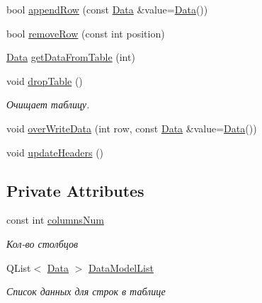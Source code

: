 \begin{DoxyCompactItemize}
\item 
bool \mbox{\hyperlink{class_my_table_model_a2d1347632c07b69acbd208cc087d6397}{append\+Row}} (const \mbox{\hyperlink{class_data}{Data}} \&value=\mbox{\hyperlink{class_data}{Data}}())
\item 
bool \mbox{\hyperlink{class_my_table_model_ae8c18be5372bf17454d21b12a368ebb3}{remove\+Row}} (const int position)
\item 
\mbox{\hyperlink{class_data}{Data}} \mbox{\hyperlink{class_my_table_model_abf64dd06923af11bcd4bdc6d759402ce}{get\+Data\+From\+Table}} (int)
\item 
\mbox{\label{class_my_table_model_a4f5e129d5da917fe2155a5e0982caf4b}} 
void \mbox{\hyperlink{class_my_table_model_a4f5e129d5da917fe2155a5e0982caf4b}{drop\+Table}} ()
\begin{DoxyCompactList}\small\item\em Очищает таблицу. \end{DoxyCompactList}\item 
void \mbox{\hyperlink{class_my_table_model_a878078058b205a92c195d43aa45376db}{over\+Write\+Data}} (int row, const \mbox{\hyperlink{class_data}{Data}} \&value=\mbox{\hyperlink{class_data}{Data}}())
\item 
void \mbox{\hyperlink{class_my_table_model_adfcdee0f5dc44c611cc8e1cfd4fec6dd}{update\+Headers}} ()
\end{DoxyCompactItemize}
\subsection*{Private Attributes}
\begin{DoxyCompactItemize}
\item 
\mbox{\label{class_my_table_model_a387efcbd2c549b89def30316fb246836}} 
const int \mbox{\hyperlink{class_my_table_model_a387efcbd2c549b89def30316fb246836}{columns\+Num}}
\begin{DoxyCompactList}\small\item\em Кол-\/во столбцов \end{DoxyCompactList}\item 
\mbox{\label{class_my_table_model_ae19c23fcd9ffecbc283af4aa949c492b}} 
Q\+List$<$ \mbox{\hyperlink{class_data}{Data}} $>$ \mbox{\hyperlink{class_my_table_model_ae19c23fcd9ffecbc283af4aa949c492b}{Data\+Model\+List}}
\begin{DoxyCompactList}\small\item\em Список данных для строк в таблице \end{DoxyCompactList}\end{DoxyCompactItemize}


